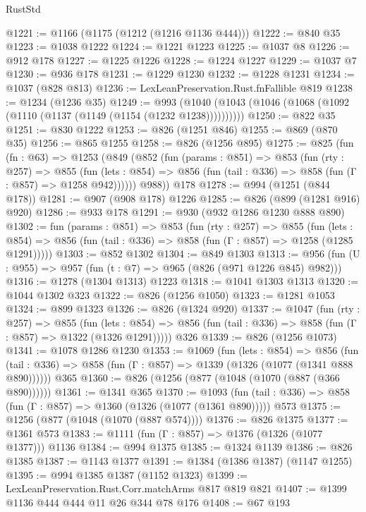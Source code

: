 \begin{lexlean}{RustStd}
\begin{coremodule}
@1221 := @1166 (@1175 (@1212 (@1216 @1136 @444)))
@1222 := @840 @35
@1223 := @1038 @1222
@1224 := @1221 @1223
@1225 := @1037 @8
@1226 := @912 @178
@1227 := @1225 @1226
@1228 := @1224 @1227
@1229 := @1037 @7
@1230 := @936 @178
@1231 := @1229 @1230
@1232 := @1228 @1231
@1234 := @1037 (@828 @813)
@1236 := LexLeanPreservation.Rust.fnFallible @819
@1238 := @1234 (@1236 @35)
@1249 := @993 (@1040 (@1043 (@1046 (@1068 (@1092 (@1110 (@1137 (@1149 (@1154 (@1232 @1238))))))))))
@1250 := @822 @35
@1251 := @830 @1222
@1253 := @826 (@1251 @846)
@1255 := @869 (@870 @35)
@1256 := @865 @1255
@1258 := @826 (@1256 @895)
@1275 := @825
    (fun (fn : @63) =>
    @1253
      (@849
        (@852
          (fun (params : @851) =>
          @853
            (fun (rty : @257) =>
            @855
              (fun (lets : @854) =>
              @856 (fun (tail : @336) => @858 (fun (Γ : @857) => @1258 @942))))))
        @988))
    @178
@1278 := @994 (@1251 (@844 @178))
@1281 := @907 (@908 @178) @1226
@1285 := @826 (@899 (@1281 @916) @920)
@1286 := @933 @178
@1291 := @930 (@932 @1286 @1230 @888 @890)
@1302 := fun (params : @851) =>
  @853
    (fun (rty : @257) =>
    @855
      (fun (lets : @854) =>
      @856 (fun (tail : @336) => @858 (fun (Γ : @857) => @1258 (@1285 @1291)))))
@1303 := @852 @1302
@1304 := @849 @1303
@1313 := @956 (fun (U : @955) => @957 (fun (t : @7) => @965 (@826 (@971 @1226 @845) @982)))
@1316 := @1278 (@1304 @1313) @1223
@1318 := @1041 @1303 @1313
@1320 := @1044 @1302 @323
@1322 := @826 (@1256 @1050)
@1323 := @1281 @1053
@1324 := @899 @1323
@1326 := @826 (@1324 @920)
@1337 := @1047
    (fun (rty : @257) =>
    @855
      (fun (lets : @854) =>
      @856 (fun (tail : @336) => @858 (fun (Γ : @857) => @1322 (@1326 @1291)))))
    @326
@1339 := @826 (@1256 @1073)
@1341 := @1078 @1286 @1230
@1353 := @1069
    (fun (lets : @854) =>
    @856 (fun (tail : @336) => @858 (fun (Γ : @857) => @1339 (@1326 (@1077 (@1341 @888 @890))))))
    @365
@1360 := @826 (@1256 (@877 (@1048 (@1070 (@887 (@366 @890))))))
@1361 := @1341 @365
@1370 := @1093
    (fun (tail : @336) => @858 (fun (Γ : @857) => @1360 (@1326 (@1077 (@1361 @890)))))
    @573
@1375 := @1256 (@877 (@1048 (@1070 (@887 @574))))
@1376 := @826 @1375
@1377 := @1361 @573
@1383 := @1111 (fun (Γ : @857) => @1376 (@1326 (@1077 @1377))) @1136
@1384 := @994 @1375
@1385 := @1324 @1139
@1386 := @826 @1385
@1387 := @1143 @1377
@1391 := @1384 (@1386 @1387) (@1147 @1255)
@1395 := @994 @1385 @1387 (@1152 @1323)
@1399 := LexLeanPreservation.Rust.Corr.matchArms @817 @819 @821
@1407 := @1399 @1136 @444 @444 @11 @26 @344 @78 @176
@1408 := @67 @193

\end{coremodule}
\end{lexlean}
